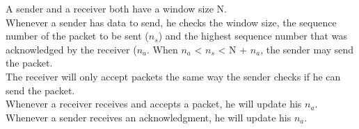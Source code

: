 A sender and a receiver both have a window size N. \\
Whenever a sender has data to send, he checks the window size, the sequence number of the packet to be sent ($n_s$) and the highest sequence number that was acknowledged by the receiver ($n_a$.
When $n_a$ < $n_s$ < N + $n_a$, the sender may send the packet. \\
The receiver will only accept packets the same way the sender checks if he can send the packet. \\
Whenever a receiver receives and accepts a packet, he will update his $n_a$. \\
Whenever a sender receives an acknowledgment, he will update his $n_a$.